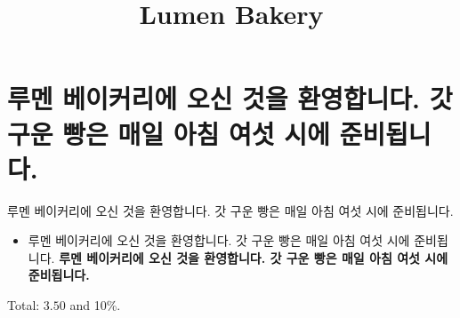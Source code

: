 \documentclass{article}
\title{Lumen Bakery}
\begin{document}
\maketitle
\section{루멘 베이커리에 오신 것을 환영합니다. 갓 구운 빵은 매일 아침 여섯 시에 준비됩니다.}
루멘 베이커리에 오신 것을 환영합니다. 갓 구운 빵은 매일 아침 여섯 시에 준비됩니다.

\begin{itemize}
\item 루멘 베이커리에 오신 것을 환영합니다. 갓 구운 빵은 매일 아침 여섯 시에 준비됩니다. \textbf{루멘 베이커리에 오신 것을 환영합니다. 갓 구운 빵은 매일 아침 여섯 시에 준비됩니다.}
\end{itemize}
Total: $3.50$ and 10\%.
\end{document}
